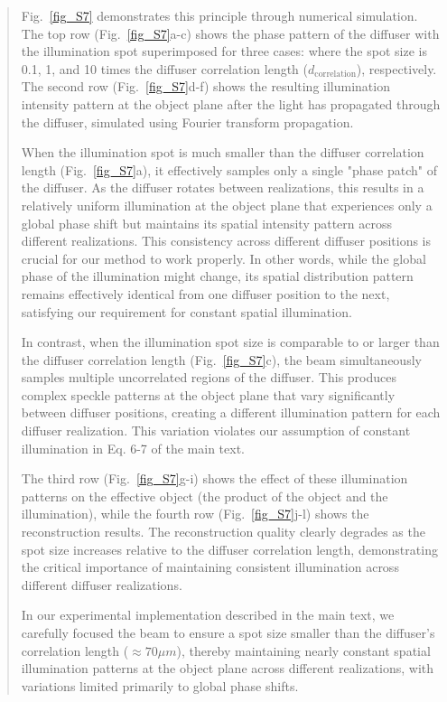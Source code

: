 \documentclass[12pt]{article}
\newenvironment{ourresponse}
    {\begin{tcolorbox}[width=\linewidth,breakable,enhanced,colback=gray!5,colframe=responsecolor!50,title=Response,left=5pt,right=5pt]}
    {\end{tcolorbox}}
\begin{document}
\begin{ourresponse}
\begin{quote}
Fig.~\ref{fig_S7} demonstrates this principle through numerical simulation. The top row (Fig.~\ref{fig_S7}a-c) shows the phase pattern of the diffuser with the illumination spot superimposed for three cases: where the spot size is 0.1, 1, and 10 times the diffuser correlation length ($d_{\text{correlation}}$), respectively. The second row (Fig.~\ref{fig_S7}d-f) shows the resulting illumination intensity pattern at the object plane after the light has propagated through the diffuser, simulated using Fourier transform propagation.

When the illumination spot is much smaller than the diffuser correlation length (Fig.~\ref{fig_S7}a), it effectively samples only a single "phase patch" of the diffuser. As the diffuser rotates between realizations, this results in a relatively uniform illumination at the object plane that experiences only a global phase shift but maintains its spatial intensity pattern across different realizations. This consistency across different diffuser positions is crucial for our method to work properly. In other words, while the global phase of the illumination might change, its spatial distribution pattern remains effectively identical from one diffuser position to the next, satisfying our requirement for constant spatial illumination.

In contrast, when the illumination spot size is comparable to or larger than the diffuser correlation length (Fig.~\ref{fig_S7}c), the beam simultaneously samples multiple uncorrelated regions of the diffuser. This produces complex speckle patterns at the object plane that vary significantly between diffuser positions, creating a different illumination pattern for each diffuser realization. This variation violates our assumption of constant illumination in Eq. 6-7 of the main text.

The third row (Fig.~\ref{fig_S7}g-i) shows the effect of these illumination patterns on the effective object (the product of the object and the illumination), while the fourth row (Fig.~\ref{fig_S7}j-l) shows the reconstruction results. The reconstruction quality clearly degrades as the spot size increases relative to the diffuser correlation length, demonstrating the critical importance of maintaining consistent illumination across different diffuser realizations.

In our experimental implementation described in the main text, we carefully focused the beam to ensure a spot size smaller than the diffuser's correlation length ($\approx 70 \mu m$), thereby maintaining nearly constant spatial illumination patterns at the object plane across different realizations, with variations limited primarily to global phase shifts.
\end{quote}

\end{ourresponse}
\end{document}
